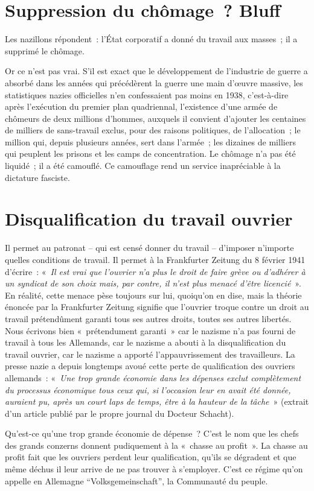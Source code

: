\documentclass[french,twoside]{book} %
\begin{document}
\section[{Suppression du chômage ? Bluff}]{Suppression du chômage ? Bluff}
\noindent Les nazillons répondent : l’État corporatif a donné du travail aux masses ; il a supprimé le chômage.\par
Or ce n’est pas vrai. S’il est exact que le développement de l’industrie de guerre a absorbé dans les années qui précédèrent la guerre une main d’œuvre massive, les statistiques nazies officielles n’en confessaient pas moins en 1938, c’est-à-dire après l’exécution du premier plan quadriennal, l’existence d’une armée de chômeurs de deux millions d’hommes, auxquels il convient d’ajouter les centaines de milliers de sans-travail exclus, pour des raisons politiques, de l’allocation ; le million qui, depuis plusieurs années, sert dans l’armée ; les dizaines de milliers qui peuplent les prisons et les camps de concentration. Le chômage n’a pas été liquidé ; il a été camouflé. Ce camouflage rend un service inapréciable à la dictature fasciste.
\section[{Disqualification du travail ouvrier}]{Disqualification du travail ouvrier}
\noindent Il permet au patronat – qui est censé donner du travail – d’imposer n’importe quelles conditions de travail. Il permet à la Frankfurter Zeitung du 8 février 1941 d’écrire : « \emph{Il est vrai que l’ouvrier n’a plus le droit de faire grève ou d’adhérer à un syndicat de son choix mais, par contre, il n’est plus menacé d’être licencié} ». En réalité, cette menace pèse toujours sur lui, quoiqu’on en dise, mais la théorie énoncée par la Frankfurter Zeitung signifie que l’ouvrier troque contre un droit au travail prétendûment garanti tous ses autres droits, toutes ses autres libertés. Nous écrivons bien « prétendument garanti » car le nazisme n’a pas fourni de travail à tous les Allemands, car le nazisme a abouti à la disqualification du travail ouvrier, car le nazisme a apporté l’appauvrissement des travailleurs. La presse nazie a depuis longtemps avoué cette perte de qualification des ouvriers allemands : « \emph{Une trop grande économie dans les dépenses exclut complètement du processus économique tous ceux qui, si l’occasion leur en avait été donnée, auraient pu, après un court laps de temps, être à la hauteur de la tâche} » (extrait d’un article publié par le propre journal du Docteur Schacht).\par
Qu’est-ce qu’une trop grande économie de dépense ? C’est le nom que les chefs des grands conzerns donnent pudiquement à la « chasse au profit ». La chasse au profit fait que les ouvriers perdent leur qualification, qu’ils se dégradent et que même déchus il leur arrive de ne pas trouver à s’employer. C’est ce régime qu’on appelle en Allemagne “Volksgemeinschaft”, la Communauté du peuple.
\end{document}
